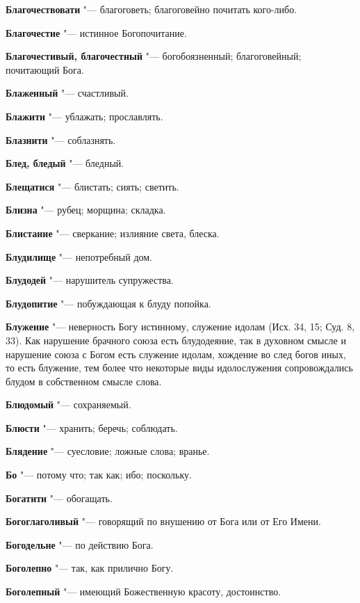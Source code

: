 \begin{mymulticols}
\noindent\textbf{Благочествовати} "--- благоговеть; благоговейно почитать кого-либо. 

\noindent\textbf{Благочестие} "--- истинное Богопочитание. 

\noindent\textbf{Благочестивый, благочестный} "--- богобоязненный; благоговейный; почитающий Бога. 

\noindent\textbf{Блаженный} "--- счастливый. 

\noindent\textbf{Блажити} "--- ублажать; прославлять. 

\noindent\textbf{Блазнити} "--- соблазнять. 

\noindent\textbf{Блед, бледый} "--- бледный. 

\noindent\textbf{Блещатися} "--- блистать; сиять; светить. 

\noindent\textbf{Близна} "--- рубец; морщина; складка. 

\noindent\textbf{Блистание} "--- сверкание; излияние света, блеска. 

\noindent\textbf{Блудилище} "--- непотребный дом. 

\noindent\textbf{Блудодей} "--- нарушитель супружества. 

\noindent\textbf{Блудопитие} "--- побуждающая к блуду попойка. 

\noindent\textbf{Блужение} "--- неверность Богу истинному, служение идолам (Исх. 34, 15; Суд. 8, 33). Как нарушение брачного союза есть блудодеяние, так в духовном смысле и нарушение союза с Богом есть служение идолам, хождение во след богов иных, то есть блужение, тем более что некоторые виды идолослужения сопровождались блудом в собственном смысле слова. 

\noindent\textbf{Блюдомый} "--- сохраняемый. 

\noindent\textbf{Блюсти} "--- хранить; беречь; соблюдать. 

\noindent\textbf{Блядение} "--- суесловие; ложные слова; вранье. 

\noindent\textbf{Бо} "--- потому что; так как; ибо; поскольку. 

\noindent\textbf{Богатити} "--- обогащать. 

\noindent\textbf{Богоглаголивый} "--- говорящий по внушению от Бога или от Его Имени. 

\noindent\textbf{Богодельне} "--- по действию Бога. 

\noindent\textbf{Боголепно} "--- так, как прилично Богу. 

\noindent\textbf{Боголепный} "--- имеющий Божественную красоту, достоинство. 


\end{mymulticols}
